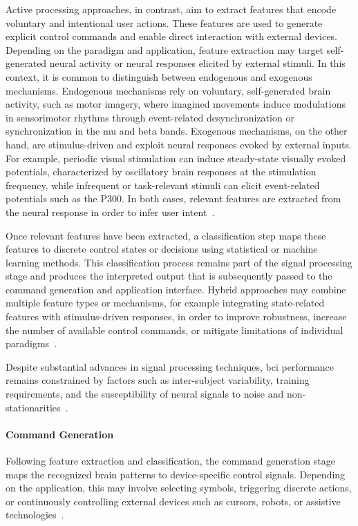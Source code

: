 Active processing approaches, in contrast, aim to extract features that encode voluntary and intentional user actions. These features are used to generate explicit control commands and enable direct interaction with external devices. Depending on the paradigm and application, feature extraction may target self-generated neural activity or neural responses elicited by external stimuli. In this context, it is common to distinguish between endogenous and exogenous mechanisms. Endogenous mechanisms rely on voluntary, self-generated brain activity, such as motor imagery, where imagined movements induce modulations in sensorimotor rhythms through event-related desynchronization or synchronization in the mu and beta bands. Exogenous mechanisms, on the other hand, are stimulus-driven and exploit neural responses evoked by external inputs. For example, periodic visual stimulation can induce steady-state visually evoked potentials, characterized by oscillatory brain responses at the stimulation frequency, while infrequent or task-relevant stimuli can elicit event-related potentials such as the P300. In both cases, relevant features are extracted from the neural response in order to infer user intent~\cite{wang-2025}.

Once relevant features have been extracted, a classification step maps these features to discrete control states or decisions using statistical or machine learning methods. This classification process remains part of the signal processing stage and produces the interpreted output that is subsequently passed to the command generation and application interface. Hybrid approaches may combine multiple feature types or mechanisms, for example integrating state-related features with stimulus-driven responses, in order to improve robustness, increase the number of available control commands, or mitigate limitations of individual paradigms~\cite{wang-2025}.

Despite substantial advances in signal processing techniques, \gls{bci} performance remains constrained by factors such as inter-subject variability, training requirements, and the susceptibility of neural signals to noise and non-stationarities~\cite{wang-2025}.

\paragraph*{Command Generation}
Following feature extraction and classification, the command generation stage maps the recognized brain patterns to device-specific control signals. Depending on the application, this may involve selecting symbols, triggering discrete actions, or continuously controlling external devices such as cursors, robots, or assistive technologies~\cite{wang-2025}.

